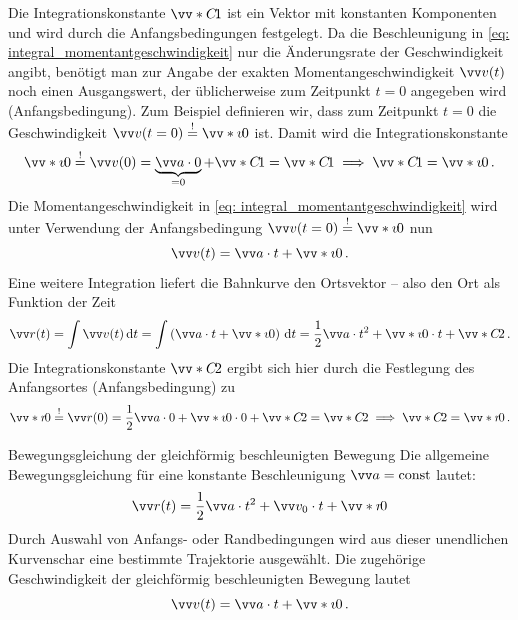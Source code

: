 Die Integrationskonstante $\ivecS{C}{1}$ ist ein Vektor mit konstanten Komponenten und wird durch die Anfangsbedingungen festgelegt. Da die Beschleunigung in \cref{eq: integral_momentantgeschwindigkeit} nur die Änderungsrate der Geschwindigkeit angibt, benötigt man zur Angabe der exakten Momentangeschwindigkeit $\ivec{v}(t)$ noch einen Ausgangswert, der üblicherweise zum Zeitpunkt $t = 0$ angegeben wird (Anfangsbedingung). Zum Beispiel definieren wir, dass zum Zeitpunkt $t = 0$ die Geschwindigkeit $\ivec{v}(t=0) \eqexcl \ivecS{v}{0}$ ist. Damit wird die Integrationskonstante \begin{equation}
    \ivecS{v}{0} \eqexcl \ivec{v}(0) = \underbrace{\ivec{a} \cdot 0}_{=0} + \ivecS{C}{1} = \ivecS{C}{1}  \implies \ivecS{C}{1} = \ivecS{v}{0} \mDot
\end{equation}
Die Momentangeschwindigkeit in \cref{eq: integral_momentantgeschwindigkeit} wird unter Verwendung der Anfangsbedingung $\ivec{v}(t=0) \eqexcl \ivecS{v}{0}$ nun 
\begin{equation}
    \ivec{v}(t) = \ivec{a} \cdot t + \ivecS{v}{0} \mDot
\end{equation}
Eine weitere Integration liefert die Bahnkurve \bzw den Ortsvektor -- also den Ort als Funktion der Zeit
\begin{equation}
    \ivec{r}(t) = \int \ivec{v}(t)\,\dd t = \int \left(\ivec{a}\cdot t + \ivecS{v}{0} \right) \,\dd t = \frac{1}{2} \ivec{a} \cdot t^2 + \ivecS{v}{0}\cdot t + \ivecS{C}{2} \mDot
\end{equation}
Die Integrationskonstante $\ivecS{C}{2}$ ergibt sich hier durch die Festlegung des Anfangsortes (Anfangsbedingung) zu 
\begin{equation}
    \ivecS{r}{0} \eqexcl \ivec{r}(0) = \frac{1}{2} \ivec{a} \cdot 0 + \ivecS{v}{0}\cdot 0 + \ivecS{C}{2} = \ivecS{C}{2} \implies \ivecS{C}{2} = \ivecS{r}{0}\mDot
\end{equation}
\begin{importantbox}{Bewegungsgleichung der gleichförmig beschleunigten Bewegung}
    Die allgemeine Bewegungsgleichung für eine konstante Beschleunigung $\ivec{a} = \const$ lautet:
    \begin{equation}\label{eq: formel_r_gleichf_beschl_bewegung}
        \ivec{r}(t) = \frac{1}{2}\ivec{a}\cdot t^{2}+\ivec{v_{0}} \cdot t + \ivecS{r}{0}
    \end{equation}
    Durch Auswahl von Anfangs- oder Randbedingungen wird aus dieser unendlichen Kurvenschar eine bestimmte Trajektorie ausgewählt. Die zugehörige Geschwindigkeit der gleichförmig beschleunigten Bewegung lautet 
    \begin{equation}\label{eq: formel_v_gleichf_beschl_bewegung}
        \ivec{v}(t) = \ivec{a} \cdot t + \ivecS{v}{0}\mDot
    \end{equation}
\end{importantbox}

